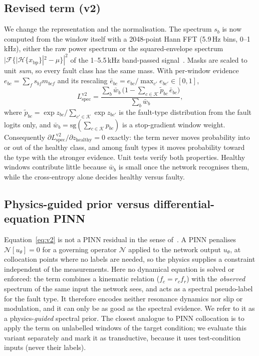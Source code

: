 \documentclass[conference]{IEEEtran}
\newcommand{\Lspec}{L_{\mathrm{spec}}}
\begin{document}
\subsection{Revised term (v2)}
We change the representation and the normalisation. The spectrum $s_b$ is now
computed from the window itself with a 2048-point Hann FFT (5.9\,Hz bins,
0--1\,kHz), either the raw power spectrum or the squared-envelope spectrum
$|\mathcal F\{|\mathcal H\{x_{\mathrm{bp}}\}|^2-\mu\}|^2$ of the 1--5.5\,kHz
band-passed signal~\cite{randall2011}. Masks are scaled to unit \emph{sum}, so
every fault class has the same mass. With per-window evidence
$e_{bc}=\sum_f s_{bf} m_{bcf}$ and its rescaling
$\bar e_{bc}=e_{bc}/\max_{c'}e_{bc'}\in[0,1]$,
\begin{equation}
\Lspec^{\mathrm{v2}}=\frac{\sum_b \bar w_b\,\bigl(1-\sum_{c\in\mathcal K}\tilde p_{bc}\,\bar e_{bc}\bigr)}{\sum_b \bar w_b},
\label{eq:v2}
\end{equation}
where $\tilde p_{bc}=\exp z_{bc}/\sum_{c'\in\mathcal K}\exp z_{bc'}$ is the
fault-type distribution from the fault logits only, and
$\bar w_b=\mathrm{sg}(\sum_{c\in\mathcal K}p_{bc})$ is a stop-gradient window
weight. Consequently $\partial\Lspec^{\mathrm{v2}}/\partial z_{\mathrm{healthy}}=0$
exactly: the term never moves probability into or out of the healthy class,
and among fault types it moves probability toward the type with the stronger
evidence. Unit tests verify both properties.
Healthy windows contribute little because $\bar w_b$ is small once the network
recognises them, while the cross-entropy alone decides healthy versus faulty.

\subsection{Physics-guided prior versus differential-equation PINN}
\label{sec:notpinn}
Equation~\eqref{eq:v2} is not a PINN residual in the sense of~\cite{raissi2019}.
A PINN penalises $\mathcal N[u_\theta]=0$ for a governing operator $\mathcal N$
applied to the network output $u_\theta$, at collocation points where no labels
are needed, so the physics supplies a constraint independent of the
measurements. Here no dynamical equation is solved or enforced: the term
combines a kinematic relation ($f_c=r_c f_r$) with the \emph{observed} spectrum
of the same input the network sees, and acts as a spectral pseudo-label for the
fault type. It therefore encodes neither resonance dynamics nor slip or
modulation, and it can only be as good as the spectral evidence. We refer to
it as a physics-\emph{guided} spectral prior. The closest analogue to PINN
collocation is to apply the term on unlabelled windows of the target
condition; we evaluate this variant separately and mark it as transductive,
because it uses test-condition inputs (never their labels).
\end{document}

